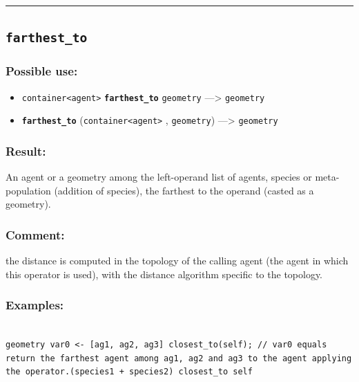 \documentclass[]{book}
\providecommand{\tightlist}{%
  \setlength{\itemsep}{0pt}\setlength{\parskip}{0pt}}
\theoremstyle{definition}
\theoremstyle{definition}
\theoremstyle{definition}
\theoremstyle{remark}
\begin{document}
\begin{center}\rule{0.5\linewidth}{\linethickness}\end{center}

\subsection{\texorpdfstring{\texttt{farthest\_to}}{farthest\_to}}\label{farthest_to}

\subsubsection{Possible use:}\label{possible-use-163}

\begin{itemize}
\tightlist
\item
  \texttt{container\textless{}agent\textgreater{}}
  \textbf{\texttt{farthest\_to}} \texttt{geometry} ---\textgreater{}
  \texttt{geometry}
\item
  \textbf{\texttt{farthest\_to}}
  (\texttt{container\textless{}agent\textgreater{}} , \texttt{geometry})
  ---\textgreater{} \texttt{geometry}
\end{itemize}

\subsubsection{Result:}\label{result-157}

An agent or a geometry among the left-operand list of agents, species or
meta-population (addition of species), the farthest to the operand
(casted as a geometry).

\subsubsection{Comment:}\label{comment-35}

the distance is computed in the topology of the calling agent (the agent
in which this operator is used), with the distance algorithm specific to
the topology.

\subsubsection{Examples:}\label{examples-122}

\begin{verbatim}
 
geometry var0 <- [ag1, ag2, ag3] closest_to(self); // var0 equals return the farthest agent among ag1, ag2 and ag3 to the agent applying the operator.(species1 + species2) closest_to self 
\end{verbatim}
\end{document}
